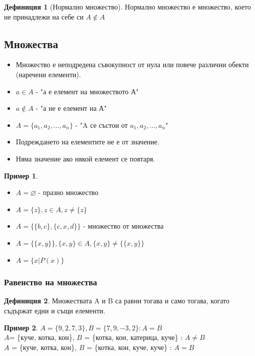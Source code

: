 \documentclass[fleqn, 12pt]{article}
\theoremstyle{definition}
\newtheorem{example}{Пример}[subsection]
\newtheorem{definition}{Дефиниция}[subsection]
\begin{document}
\begin{definition}[Нормално множество]
Нормално множество е множество, което не принадлежи на себе си $A \notin A$
\end{definition}

\subsection{Множества}
\begin{itemize} 
	\item Множество е неподредена съвокупност от нула или повече различни обекти (наречени елементи). 
 	\item $a \in A$ - "а е елемент на множеството А" 
	\item $a \notin A$ - "а не е елемент на А"
	\item $A = \{ a_1, a_2, ..., a_n\}$ - "A се състои от $a_1, a_2, ..., a_n$"
	\item Подреждането на елементите не е от значение.
	\item Няма значение ако някой елемент се повтаря. 
\end{itemize}

\begin{example}

\begin{itemize}
Примери за множества: \\
	\item $A = \varnothing$ - празно множество 
	\item $A = \{z\}, z \in A, z \neq \{z\}$
	\item $A =\{ \{b,c \}, \{c, x, d \} \}$ - множество от множества 
	\item $A = \{\{ x, y \}\}, \{x,y\} \in A, \{x,y\} \neq \{\{x,y\}\}$
	\item $A = \{x | P(x) \}$
\end{itemize}

\end{example}

\subsubsection{Равенство на множества}

\begin{definition}
Множествата A и B са равни тогава и само тогава, когато съдържат едни и същи елементи.
\end{definition}

\begin{example}
$A = \{9, 2, 7, 3\}, B = \{7, 9, -3, 2\} : A = B$\\
$A$= \{куче, котка, кон\}, $B$ = \{котка, кон, катерица, куче\} : $A\neq B$ \\
$A$ = \{куче, котка, кон\}, $B$ = \{котка, кон, куче, куче\}  : $A = B$
\end{example}
\end{document}
